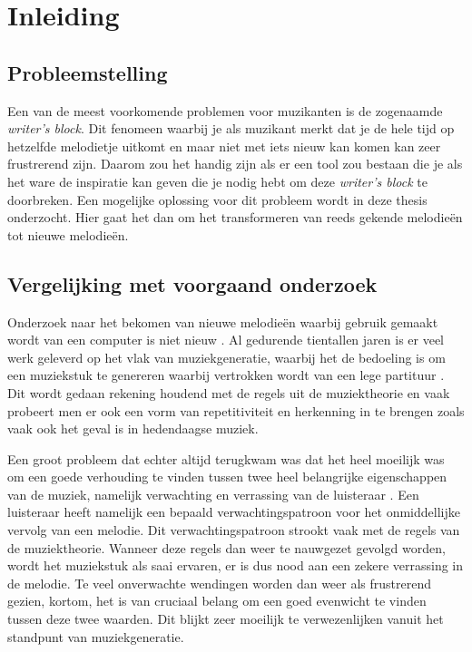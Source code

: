 \chapter{Inleiding}
\label{hoofdstuk:I}


\section{Probleemstelling}
Een van de meest voorkomende problemen voor muzikanten is de zogenaamde \textit{writer's block}. Dit fenomeen waarbij je als muzikant merkt dat je de hele tijd op hetzelfde melodietje uitkomt en maar niet met iets nieuw kan komen kan zeer frustrerend zijn. Daarom zou het handig zijn als er een tool zou bestaan die je als het ware de inspiratie kan geven die je nodig hebt om deze \textit{writer's block} te doorbreken. Een mogelijke oplossing voor dit probleem wordt in deze thesis onderzocht. Hier gaat het dan om het transformeren van reeds gekende melodie\"en tot nieuwe melodie\"en.

\section{Vergelijking met voorgaand onderzoek}
Onderzoek naar het bekomen van nieuwe melodie\"en waarbij gebruik gemaakt wordt van een computer is niet nieuw \cite{thesis:thomas} \cite{book:musicAndProbability}. Al gedurende tientallen jaren is er veel werk geleverd op het vlak van muziekgeneratie, waarbij het de bedoeling is om een muziekstuk te genereren waarbij vertrokken wordt van een lege partituur \cite{book:musicGeeksNerds}. Dit wordt gedaan rekening houdend met de regels uit de muziektheorie en vaak probeert men er ook een vorm van repetitiviteit en herkenning in te brengen zoals vaak ook het geval is in hedendaagse muziek. 

Een groot probleem dat echter altijd terugkwam was dat het heel moeilijk was om een goede verhouding te vinden tussen twee heel belangrijke eigenschappen van de muziek, namelijk verwachting en verrassing van de luisteraar \cite{book:musimathics}. Een luisteraar heeft namelijk een bepaald verwachtingspatroon voor het onmiddellijke vervolg van een melodie. Dit verwachtingspatroon strookt vaak met de regels van de muziektheorie. Wanneer deze regels dan weer te nauwgezet gevolgd worden, wordt het muziekstuk als saai ervaren, er is dus nood aan een zekere verrassing in de melodie. Te veel onverwachte wendingen worden dan weer als frustrerend gezien, kortom, het is van cruciaal belang om een goed evenwicht te vinden tussen deze twee waarden. Dit blijkt zeer moeilijk te verwezenlijken vanuit het standpunt van muziekgeneratie.\\

